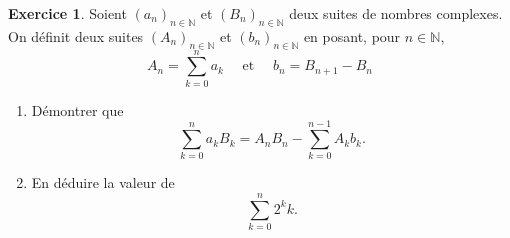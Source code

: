 \documentclass[a4paper, 11pt,openany]{article}%
\theoremstyle{plain}
\theoremstyle{definition}
\newtheorem{exo}{Exercice}
\newtheorem{sol}{Solution de l'exercice}
\theoremstyle{remark}
\newcommand{\N}{\mathbb{N}}
\begin{document}
\begin{exo}
	Soient $(a_n)_{n\in \N}$ et $(B_n)_{n\in \N}$ deux suites de nombres complexes. On définit deux suites $(A_n)_{n\in \N}$ et $(b_n)_{n\in\N}$ en posant, pour $n\in \N$, 
	\[
		A_n = \sum_{k=0}^n a_k 
		\quad  \mbox{ et }\quad 
		b_n = B_{n+1} - B_n 
	\]
	\begin{enumerate}[label=\arabic*.]
		\item Démontrer que $$\sum_{k=0}^n a_kB_k = A_nB_n - \sum_{k=0}^{n-1}A_kb_k .$$
		\item En déduire la valeur de $$\sum_{k=0}^n 2^k k. $$
	\end{enumerate}
\end{exo}

\end{document}
